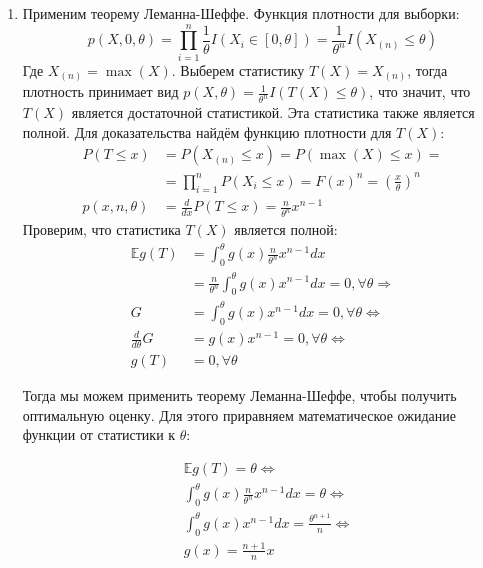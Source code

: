 \documentclass{article}
\begin{document}
\begin{enumerate}
	\item Применим теорему Леманна-Шеффе. Функция плотности для
	      выборки:
	      \[
		      p(X, 0, \theta) =
		      \prod_{i=1}^n \frac{1}{\theta} I(X_i \in [0, \theta]) =
		      \frac{1}{\theta^n} I(X_{(n)} \leq \theta)
	      \]
	      Где $X_{(n)} = \max(X)$.
	      Выберем статистику $T(X) = X_{(n)}$, тогда плотность принимает
	      вид $p(X, \theta) = \frac{1}{\theta^n} I(T(X) \leq \theta)$,
	      что значит, что $T(X)$ является достаточной статистикой.
	      Эта статистика также является полной. Для доказательства
	      найдём функцию плотности для $T(X)$:
	      \begin{equation*}
		      \begin{aligned}
			      P(T \leq x)     & = P(X_{(n)} \leq x) = P(\max(X) \leq x) =                                  \\
			                      & = \prod_{i=1}^n P(X_i \leq x) = F(x)^n = \left( \frac{x}{\theta} \right)^n \\
			      p(x, n, \theta) & = \frac{d}{dx} P(T \leq x) = \frac{n}{\theta^n} x^{n-1}
		      \end{aligned}
	      \end{equation*}
	      Проверим, что статистика $T(X)$ является полной:
	      \begin{equation*}
		      \begin{aligned}
			      \mathbb{E}g(T)      & = \int_0^\theta g(x) \frac{n}{\theta^n} x^{n-1} dx                                     \\
			                          & = \frac{n}{\theta^n} \int_0^\theta g(x) x^{n-1} dx = 0, \forall \theta \Longrightarrow \\
			      G                   & = \int_0^\theta g(x) x^{n-1} dx = 0, \forall \theta \iff                               \\
			      \frac{d}{d\theta} G & = g(x) x^{n-1} = 0, \forall \theta \iff                                                \\
			      g(T)                & = 0, \forall \theta
		      \end{aligned}
	      \end{equation*}

	      Тогда мы можем применить теорему Леманна-Шеффе,
	      чтобы получить оптимальную оценку. Для этого приравняем
	      математическое ожидание функции от статистики к $\theta$:

	      \begin{equation*}
		      \begin{aligned}
			       & \mathbb{E}g(T) = \theta \iff                                   \\
			       & \int_0^\theta g(x) \frac{n}{\theta^n} x^{n-1} dx = \theta \iff \\
			       & \int_0^\theta g(x) x^{n-1} dx = \frac{\theta^{n+1}}{n} \iff    \\
			       & g(x) = \frac{n+1}{n} x
		      \end{aligned}
	      \end{equation*}


\end{enumerate}
\end{document}
